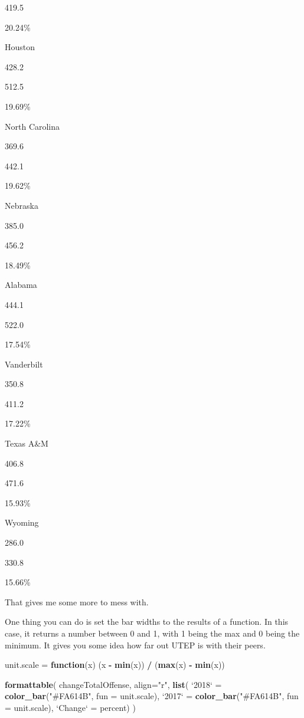 \documentclass[]{book}
\newenvironment{Shaded}{\begin{snugshade}}{\end{snugshade}}
\newcommand{\KeywordTok}[1]{\textcolor[rgb]{0.13,0.29,0.53}{\textbf{#1}}}
\newcommand{\DataTypeTok}[1]{\textcolor[rgb]{0.13,0.29,0.53}{#1}}
\newcommand{\StringTok}[1]{\textcolor[rgb]{0.31,0.60,0.02}{#1}}
\newcommand{\ControlFlowTok}[1]{\textcolor[rgb]{0.13,0.29,0.53}{\textbf{#1}}}
\newcommand{\OperatorTok}[1]{\textcolor[rgb]{0.81,0.36,0.00}{\textbf{#1}}}
\newcommand{\NormalTok}[1]{#1}
\begin{document}
{419.5}

20.24\%

Houston

428.2

{512.5}

19.69\%

North Carolina

369.6

{442.1}

19.62\%

Nebraska

385.0

{456.2}

18.49\%

Alabama

444.1

{522.0}

17.54\%

Vanderbilt

350.8

{411.2}

17.22\%

Texas A\&M

406.8

{471.6}

15.93\%

Wyoming

286.0

{330.8}

15.66\%

That gives me some more to mess with.

One thing you can do is set the bar widths to the results of a function.
In this case, it returns a number between 0 and 1, with 1 being the max
and 0 being the minimum. It gives you some idea how far out UTEP is with
their peers.

\begin{Shaded}
\begin{Highlighting}[]
\NormalTok{unit.scale =}\StringTok{ }\ControlFlowTok{function}\NormalTok{(x) (x }\OperatorTok{-}\StringTok{ }\KeywordTok{min}\NormalTok{(x)) }\OperatorTok{/}\StringTok{ }\NormalTok{(}\KeywordTok{max}\NormalTok{(x) }\OperatorTok{-}\StringTok{ }\KeywordTok{min}\NormalTok{(x))}

\KeywordTok{formattable}\NormalTok{(}
\NormalTok{  changeTotalOffense, }
  \DataTypeTok{align=}\StringTok{"r"}\NormalTok{,}
  \KeywordTok{list}\NormalTok{(}
    \StringTok{`}\DataTypeTok{2018}\StringTok{`}\NormalTok{ =}\StringTok{ }\KeywordTok{color_bar}\NormalTok{(}\StringTok{"#FA614B"}\NormalTok{, }\DataTypeTok{fun =}\NormalTok{ unit.scale), }
    \StringTok{`}\DataTypeTok{2017}\StringTok{`}\NormalTok{ =}\StringTok{ }\KeywordTok{color_bar}\NormalTok{(}\StringTok{"#FA614B"}\NormalTok{, }\DataTypeTok{fun =}\NormalTok{ unit.scale), }
    \StringTok{`}\DataTypeTok{Change}\StringTok{`}\NormalTok{ =}\StringTok{ }\NormalTok{percent)}
\NormalTok{  )}
\end{Highlighting}
\end{Shaded}
\end{document}

